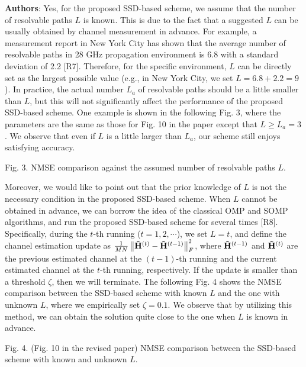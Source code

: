 \documentclass[a4paper,12pt]{article}
\begin{document}
{\color{blue} \textbf{Authors}: Yes, for the proposed SSD-based scheme, we assume that the number of resolvable paths ${L}$ is known. This is due to the fact that a suggested ${L}$ can be usually obtained by channel measurement in advance. For example, a measurement report in New York City has shown that the average number of resolvable paths in 28 GHz propagation environment is 6.8 with a standard deviation of 2.2 [R7]. Therefore, for the specific environment, ${L}$ can be directly set as the largest possible value (e.g., in New York City, we set ${L = 6.8+2.2 = 9}$). In practice, the actual number ${L_a}$ of resolvable paths should be a little smaller than ${L}$, but this will not significantly affect the performance of the proposed SSD-based scheme. One example is shown in the following Fig. 3, where the parameters are the same as those for Fig. 10 in the paper except that ${L \ge L_a = 3}$. We observe that even if ${L}$ is a little larger than ${L_a}$, our scheme still enjoys satisfying accuracy.

Fig. 3. NMSE comparison against the assumed number of resolvable paths ${L}$.

Moreover, we would like to point out that the prior knowledge of ${L}$ is not the necessary condition in the proposed SSD-based scheme. When ${L}$ cannot be obtained in advance, we can borrow the idea of the classical OMP and SOMP algorithms, and run the proposed SSD-based scheme for several times [R8]. Specifically, during the ${t}$-th running (${t = 1,2, \cdots }$), we set ${L = t}$, and define the channel estimation update as ${\frac{1}{{MN}}\left\| {{{{\bf{\tilde H}}}^{\left( t \right)}} - {{{\bf{\tilde H}}}^{\left( {t - 1} \right)}}} \right\|_F^2}$, where ${{{{{\bf{\tilde H}}}^{\left( {t - 1} \right)}}}}$ and ${{{{{\bf{\tilde H}}}^{\left( t \right)}}}}$ are the previous estimated channel at the ${\left( {t - 1} \right)}$-th running and the current estimated channel at the ${t}$-th running, respectively. If the update is smaller than a threshold ${\zeta }$, then we will terminate. The following Fig. 4 shows the NMSE comparison between the SSD-based scheme with known ${L}$ and the one with unknown ${L}$, where we empirically set ${\zeta = 0.1}$. We observe that by utilizing this method, we can obtain the solution quite close to the one when ${L}$ is known in advance.


Fig. 4. (Fig. 10 in the revised paper) NMSE comparison between the SSD-based scheme with known and unknown ${L}$.



}
\end{document}
